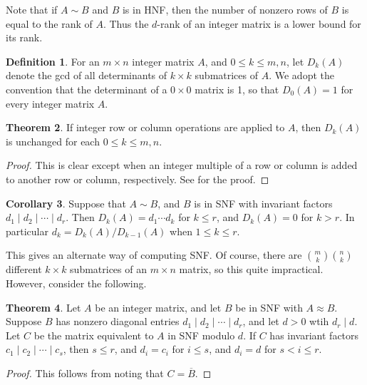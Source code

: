 \documentclass[12pt,a4paper]{article}
\theoremstyle{definition}
\newtheorem{theorem}{Theorem}[section]
\newtheorem{definition}[theorem]{Definition}
\newtheorem{corollary}[theorem]{Corollary}
\begin{document}
Note that if $A\sim B$ and $B$ is in HNF, then the number of nonzero rows of $B$ is equal to the rank of $A$. Thus the $d$-rank of an integer matrix is a lower bound for its rank.

\begin{definition}
  For an $m\times n$ integer matrix $A$, and $0\leq k\leq m,n$, let $D_k(A)$ denote the gcd of all determinants of $k\times k$ submatrices of $A$. We adopt the convention that the determinant of a $0\times0$ matrix is 1, so that $D_0(A)=1$ for every integer matrix $A$.
\end{definition}

\begin{theorem}
   If integer row or column operations are applied to $A$, then $D_k(A)$ is unchanged for each $0\leq k\leq m,n$.
\end{theorem}

\begin{proof}
  This is clear except when an integer multiple of a row or column is added to another row or column, respectively. See \cite{sims} for the proof.
\end{proof}

\begin{corollary}
  \label{gcdcor}
  Suppose that $A\sim B$, and $B$ is in SNF with invariant factors $d_1\mid d_2\mid\cdots\mid d_r$. Then $D_k(A)=d_1\cdots d_k$ for $k\leq r$, and $D_k(A)=0$ for $k>r$. In particular $d_k=D_k(A)/D_{k-1}(A)$ when $1\leq k\leq r$.
\end{corollary}

This gives an alternate way of computing SNF. Of course, there are $\binom{m}{k}\binom{n}{k}$ different $k\times k$ submatrices of an $m\times n$ matrix, so this quite impractical. However, consider the following.

\begin{theorem}
  \label{recoversnf}
  Let $A$ be an integer matrix, and let $B$ be in SNF with $A\approx B$. Suppose $B$ has nonzero diagonal entries $d_1\mid d_2\mid \cdots\mid d_r$, and let $d>0$ wtih $d_r\mid d$. Let $C$ be the matrix equivalent to $A$ in SNF modulo $d$. If $C$ has invariant factors $c_1\mid c_2\mid\cdots\mid c_s$, then $s\leq r$, and $d_i=c_i$ for $i\leq s$, and $d_i=d$ for $s<i\leq r$.
\end{theorem}

\begin{proof}
  This follows from noting that $C=\overline{B}$.
\end{proof}
\end{document}
